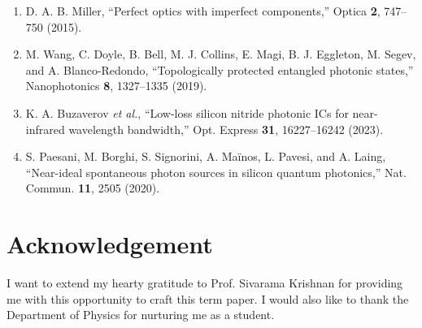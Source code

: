 \documentclass[journal,11pt]{IEEEtran}
\begin{document}
{\begin{enumerate}
\item D. A. B. Miller, ``Perfect optics with imperfect components,'' Optica \textbf{2}, 747--750 (2015).
\item M. Wang, C. Doyle, B. Bell, M. J. Collins, E. Magi, B. J. Eggleton, M. Segev, and A. Blanco-Redondo, ``Topologically protected entangled photonic states,'' Nanophotonics \textbf{8}, 1327--1335 (2019).
\item K. A. Buzaverov \emph{et al.}, ``Low-loss silicon nitride photonic ICs for near-infrared wavelength bandwidth,'' Opt. Express \textbf{31}, 16227--16242 (2023).
\item S. Paesani, M. Borghi, S. Signorini, A. Ma\"inos, L. Pavesi, and A. Laing, ``Near-ideal spontaneous photon sources in silicon quantum photonics,'' Nat. Commun. \textbf{11}, 2505 (2020).
\end{enumerate}}

\section*{Acknowledgement}\small
I want to extend my hearty gratitude to Prof. Sivarama Krishnan for providing me with this opportunity to craft this term paper. I would also like to thank the Department of Physics for nurturing me as a student.
\end{document}
